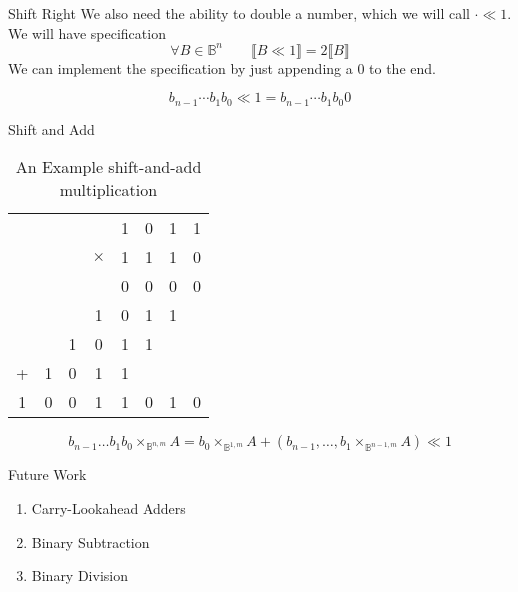 \documentclass[aspectratio=169]{beamer}
\begin{document}
\begin{frame}{Shift Right}
  We also need the ability to double a number, which we will call $\cdot \ll 1$.
  \pause We will have specification
  \[\forall B \in \mathbb{B}^{n} \qquad \llbracket B \ll 1 \rrbracket = 2\llbracket B \rrbracket\]
  \pause We can implement the specification by just appending a $0$ to the end.

  \[b_{n-1}\cdots b_{1}b_{0} \ll 1 = b_{n-1}\cdots b_{1} b_{0} 0\]
\end{frame}

\begin{frame}{Shift and Add}
\begin{table}
  \begin{tabular}{c|c|c|c|c|c|c|c}
    &  & & & 1 & 0 & 1 & 1 \\
    &  & & $\times$ & 1 & 1 & 1 & 0 \\
    \hline

    &  & & & 0 & 0 & 0 & 0 \\
    &  & & 1 & 0 & 1 & 1 &  \\
     & & 1 & 0 & 1 & 1 & &   \\
      + & 1 & 0 & 1 & 1 &    \\
    \hline

      1 & 0 & 0 & 1 & 1 & 0 & 1 & 0    \\
\end{tabular}
\centering
\caption{An Example shift-and-add multiplication}
\label{tab:mul}
\end{table}

\begin{equation}\label{equation:addnshift}
  b_{n-1}\ldots b_{1}b_{0} \times_{\mathbb{B}^{n, m}} A = b_{0}\times_{\mathbb{B}^{1,m}} A + (b_{n-1}, \ldots, b_{1} \times_{\mathbb{B}^{n-1, m}} A) \ll 1
\end{equation}


\end{frame}


\begin{frame}{Future Work}
  \begin{enumerate}
    \item Carry-Lookahead Adders
    \pause \item Binary Subtraction
    \item Binary Division
\end{enumerate}
\end{frame}
\end{document}
